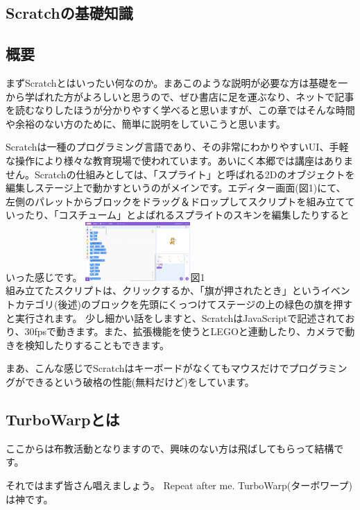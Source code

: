 \documentclass[b5paper,10pt]{jsarticle}
\begin{document}
\begin{multicols*}{3}
\section{Scratchの基礎知識}
\subsection{概要}
まずScratchとはいったい何なのか。まあこのような説明が必要な方は基礎を一から学ばれた方がよろしいと思うので、ぜひ書店に足を運ぶなり、ネットで記事を読むなりしたほうが分かりやすく学べると思いますが、この章ではそんな時間や余裕のない方のために、簡単に説明をしていこうと思います。

Scratchは一種のプログラミング言語であり、その非常にわかりやすいUI、手軽な操作により様々な教育現場で使われています。あいにく本郷では講座はありません。Scratchの仕組みとしては、「スプライト」と呼ばれる2Dのオブジェクトを編集しステージ上で動かすというのがメインです。エディター画面(図1)にて、左側のパレットからブロックをドラッグ＆ドロップしてスクリプトを組み立てていったり、「コスチューム」とよばれるスプライトのスキンを編集したりするといった感じです。
\includegraphics[width=4cm]{editor.png}図1\\
組み立てたスクリプトは、クリックするか、「旗が押されたとき」というイベントカテゴリ(後述)のブロックを先頭にくっつけてステージの上の緑色の旗を押すと実行されます。
少し細かい話をしますと、ScratchはJavaScriptで記述されており、30fpsで動きます。また、拡張機能を使うとLEGOと連動したり、カメラで動きを検知したりすることもできます。

まあ、こんな感じでScratchはキーボードがなくてもマウスだけでプログラミングができるという破格の性能(無料だけど)をしています。
\subsection{TurboWarpとは}
ここからは布教活動となりますので、興味のない方は飛ばしてもらって結構です。

それではまず皆さん唱えましょう。
Repeat after me.
TurboWarp(ターボワープ)は神です。


\end{multicols*}
\end{document}
